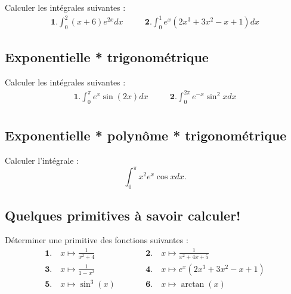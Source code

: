 Calculer les intégrales suivantes  :
$$\begin{array}{lcl}
\displaystyle \mathbf{1.}\int_{0}^2 (x+6)e^{2x}dx &\quad&\displaystyle \mathbf{2.} \int_0^1 e^x(2x^3+3x^2-x+1)dx
\end{array}$$




\vspace{1em}
\subsection{Exponentielle * trigonométrique}

Calculer les intégrales suivantes  :
$$\begin{array}{lcl}
\displaystyle \mathbf{1.} \int_0^\pi e^x\sin(2x)dx&\quad&\displaystyle \mathbf{2.} \int_0^{2\pi}e^{-x}\sin^2 xdx\\
\end{array}$$




\vspace{1em}
\subsection{Exponentielle * polynôme * trigonométrique}

Calculer l'intégrale :
$$\int_0^\pi x^2e^x \cos xdx.$$




\vspace{1em}
\subsection{Quelques primitives à savoir calculer!}

Déterminer une primitive des fonctions suivantes :
$$
\begin{array}{lcl}
\displaystyle \mathbf{1.}\quad x\mapsto \frac{1}{x^2+4}&\quad\quad&\displaystyle \mathbf{2.}\quad x\mapsto\frac{1}{x^2+4x+5}\\
\displaystyle \mathbf{3.}\quad x\mapsto \frac{1}{1-x^2}&&\displaystyle \mathbf{4.}\quad x\mapsto e^x(2x^3+3x^2-x+1)\\
\displaystyle \mathbf{5.}\quad x\mapsto\sin^3(x)&&\displaystyle \mathbf{6.}\quad x\mapsto \arctan(x)
\end{array}$$






